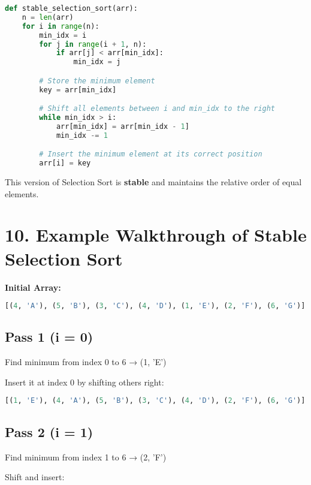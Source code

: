 \documentclass[14pt]{extarticle}
\begin{document}
\begin{lstlisting}[language=Python]
def stable_selection_sort(arr):
    n = len(arr)
    for i in range(n):
        min_idx = i
        for j in range(i + 1, n):
            if arr[j] < arr[min_idx]:
                min_idx = j

        # Store the minimum element
        key = arr[min_idx]

        # Shift all elements between i and min_idx to the right
        while min_idx > i:
            arr[min_idx] = arr[min_idx - 1]
            min_idx -= 1

        # Insert the minimum element at its correct position
        arr[i] = key
\end{lstlisting}

\begin{tcolorbox}[
  colback=white,
  colframe=black,
  title=Result
]
This version of Selection Sort is \textbf{stable} and maintains the relative order of equal elements.
\end{tcolorbox}

\section*{10. Example Walkthrough of Stable Selection Sort}

\textbf{Initial Array:}

\begin{lstlisting}[language=Python]
[(4, 'A'), (5, 'B'), (3, 'C'), (4, 'D'), (1, 'E'), (2, 'F'), (6, 'G')]
\end{lstlisting}

\subsection*{Pass 1 (i = 0)}
Find minimum from index 0 to 6 → (1, 'E')

Insert it at index 0 by shifting others right:

\begin{lstlisting}[language=Python]
[(1, 'E'), (4, 'A'), (5, 'B'), (3, 'C'), (4, 'D'), (2, 'F'), (6, 'G')]
\end{lstlisting}

\subsection*{Pass 2 (i = 1)}
Find minimum from index 1 to 6 → (2, 'F')

Shift and insert:
\end{document}
